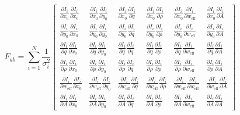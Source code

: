 \documentclass[12pt]{article}
\begin{document}
\[
F_{ab}
=
\sum_{i=1}^{N}
\frac{1}{\sigma_i^2}
\begin{bmatrix}
\frac{\partial I_i}{\partial x_0}\frac{\partial I_i}{\partial x_0}
&
\frac{\partial I_i}{\partial x_0}\frac{\partial I_i}{\partial y_0}
&
\frac{\partial I_i}{\partial x_0}\frac{\partial I_i}{\partial q}
&
\frac{\partial I_i}{\partial x_0}\frac{\partial I_i}{\partial \rho}
&
\frac{\partial I_i}{\partial x_0}\frac{\partial I_i}{\partial w_{\text{eff}}}
&
\frac{\partial I_i}{\partial x_0}\frac{\partial I_i}{\partial A}
\\[1.2em]
\frac{\partial I_i}{\partial y_0}\frac{\partial I_i}{\partial x_0}
&
\frac{\partial I_i}{\partial y_0}\frac{\partial I_i}{\partial y_0}
&
\frac{\partial I_i}{\partial y_0}\frac{\partial I_i}{\partial q}
&
\frac{\partial I_i}{\partial y_0}\frac{\partial I_i}{\partial \rho}
&
\frac{\partial I_i}{\partial y_0}\frac{\partial I_i}{\partial w_{\text{eff}}}
&
\frac{\partial I_i}{\partial y_0}\frac{\partial I_i}{\partial A}
\\[1.2em]
\frac{\partial I_i}{\partial q}\frac{\partial I_i}{\partial x_0}
&
\frac{\partial I_i}{\partial q}\frac{\partial I_i}{\partial y_0}
&
\frac{\partial I_i}{\partial q}\frac{\partial I_i}{\partial q}
&
\frac{\partial I_i}{\partial q}\frac{\partial I_i}{\partial \rho}
&
\frac{\partial I_i}{\partial q}\frac{\partial I_i}{\partial w_{\text{eff}}}
&
\frac{\partial I_i}{\partial q}\frac{\partial I_i}{\partial A}
\\[1.2em]
\frac{\partial I_i}{\partial \rho}\frac{\partial I_i}{\partial x_0}
&
\frac{\partial I_i}{\partial \rho}\frac{\partial I_i}{\partial y_0}
&
\frac{\partial I_i}{\partial \rho}\frac{\partial I_i}{\partial q}
&
\frac{\partial I_i}{\partial \rho}\frac{\partial I_i}{\partial \rho}
&
\frac{\partial I_i}{\partial \rho}\frac{\partial I_i}{\partial w_{\text{eff}}}
&
\frac{\partial I_i}{\partial \rho}\frac{\partial I_i}{\partial A}
\\[1.2em]
\frac{\partial I_i}{\partial w_{\text{eff}}}\frac{\partial I_i}{\partial x_0}
&
\frac{\partial I_i}{\partial w_{\text{eff}}}\frac{\partial I_i}{\partial y_0}
&
\frac{\partial I_i}{\partial w_{\text{eff}}}\frac{\partial I_i}{\partial q}
&
\frac{\partial I_i}{\partial w_{\text{eff}}}\frac{\partial I_i}{\partial \rho}
&
\frac{\partial I_i}{\partial w_{\text{eff}}}\frac{\partial I_i}{\partial w_{\text{eff}}}
&
\frac{\partial I_i}{\partial w_{\text{eff}}}\frac{\partial I_i}{\partial A}
\\[1.2em]
\frac{\partial I_i}{\partial A}\frac{\partial I_i}{\partial x_0}
&
\frac{\partial I_i}{\partial A}\frac{\partial I_i}{\partial y_0}
&
\frac{\partial I_i}{\partial A}\frac{\partial I_i}{\partial q}
&
\frac{\partial I_i}{\partial A}\frac{\partial I_i}{\partial \rho}
&
\frac{\partial I_i}{\partial A}\frac{\partial I_i}{\partial w_{\text{eff}}}
&
\frac{\partial I_i}{\partial A}\frac{\partial I_i}{\partial A}
\end{bmatrix}
\]
\end{document}
